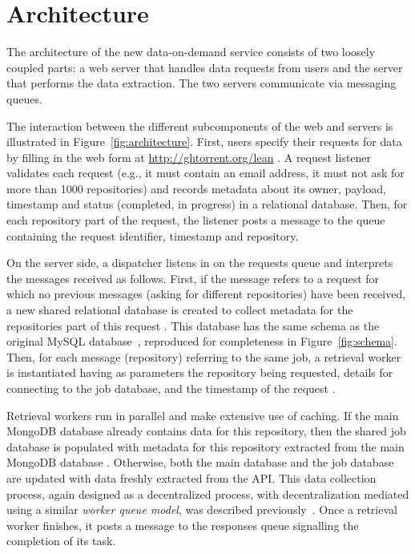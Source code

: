 
\section{Architecture}
\label{sec:arch}

The architecture of the new \ght data-on-demand service consists of two loosely coupled parts:
a web server that handles data requests from users and the \ght server that performs the data extraction.
The two servers communicate via messaging queues.

The interaction between the different subcomponents of the web and \ght servers is illustrated in
Figure~\ref{fig:architecture}.
First, users specify their requests for data by filling in the web form at \url{http://ghtorrent.org/lean} .
A request listener validates each request (e.g., it must contain an email address, it must not ask for
more than 1000 repositories)
and records metadata about its owner, payload,
timestamp and status (completed, in progress) in
a relational database.
Then, for each \gh repository part of the request, the listener posts a message to the queue 
containing the request identifier, timestamp and repository.

On the \ght server side, a dispatcher listens in on the requests queue  and interprets the
messages received as follows.
First, if the message refers to a request for which no previous messages (asking for different repositories)
have been received, a new shared relational database is created to collect metadata for the repositories part
of this request .
This database has the same schema as the original \ght MySQL database~\cite{gousios2012ghtorent},
reproduced for completeness in Figure~\ref{fig:schema}.
Then, for each message (repository) referring to the same job, a retrieval worker is instantiated having
as parameters the repository being requested, details for connecting to the job database, and the
timestamp of the request .

Retrieval workers run in parallel and make extensive use of caching.
If the main \ght MongoDB database already contains data for this repository,
then the shared job database is populated with metadata for this
repository extracted from the main \ght MongoDB database .
Otherwise, both the main \ght database and the job database  are updated with data freshly extracted
from the \gh API.
This data collection process, again designed as a decentralized process, with decentralization mediated
using a similar \emph{worker queue model}, was described previously~\cite{gousios2013ghtorent}.
Once a retrieval worker finishes, it posts a message to the responses queue  signalling
the completion of its task.

